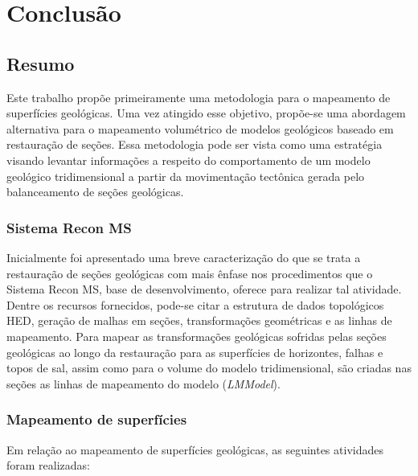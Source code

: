
\chapter{Conclusão}

\section{Resumo}

Este trabalho propõe primeiramente uma metodologia para o mapeamento de superfícies geológicas. Uma vez atingido esse objetivo, propõe-se uma abordagem alternativa para o mapeamento volumétrico de modelos geológicos baseado em restauração de seções. Essa metodologia pode ser vista como uma estratégia visando levantar informações a respeito do comportamento de um modelo geológico tridimensional a partir da movimentação tectônica gerada pelo balanceamento de seções geológicas.

\subsection*{Sistema Recon MS}

Inicialmente foi apresentado uma breve caracterização do que se trata a restauração de seções geológicas com mais ênfase nos procedimentos que o Sistema Recon MS, base de desenvolvimento, oferece para realizar tal atividade. Dentre os recursos fornecidos, pode-se citar a estrutura de dados topológicos HED, geração de malhas em seções, transformações geométricas e as linhas de mapeamento. Para mapear as transformações geológicas sofridas pelas seções geológicas ao longo da restauração para as superfícies de horizontes, falhas e topos de sal, assim como para o volume do modelo tridimensional, são criadas nas seções as linhas de mapeamento do modelo (\emph{LMModel}). 

\subsection*{Mapeamento de superfícies}

Em relação ao mapeamento de superfícies geológicas, as seguintes atividades foram realizadas:

